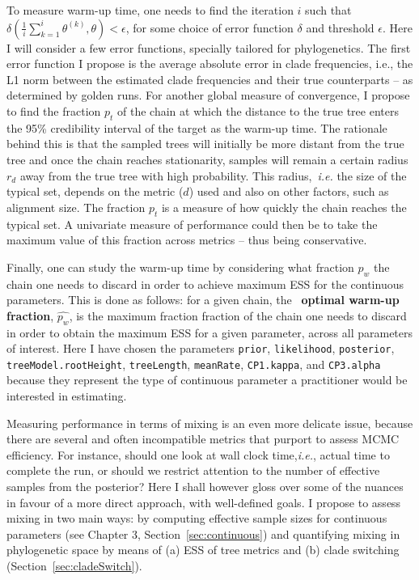 To measure warm-up time, one needs to find the iteration $i$ such that $\delta(\frac{1}{i}\sum_{k=1}^i\theta^{(k)}, \theta) < \epsilon$, for some choice of error function $\delta$ and threshold $\epsilon$.
Here I will consider a few error functions, specially tailored for phylogenetics.
The first error function I propose is the average absolute error in clade frequencies, i.e., the L1 norm between the estimated clade frequencies and their true counterparts -- as determined by golden runs.
For another global measure of convergence, I propose to find the fraction $p_t$ of the chain at which the distance to the true tree enters the 95\% credibility interval of the target as the warm-up time.
The rationale behind this is that the sampled trees will initially be more distant from the true tree and  once the chain reaches stationarity, samples will remain a certain radius $r_d$ away from the true tree with high probability.
This radius,~\textit{i.e.} the size of the typical set, depends on the metric ($d$) used and also on other factors, such as alignment size.
The fraction $p_t$ is a measure of how quickly the chain reaches the typical set.
A univariate measure of performance could then be to take the maximum value of this fraction across metrics -- thus being conservative.

Finally, one can study the warm-up time by considering what fraction $p_w$ the chain one needs to discard in order to achieve maximum ESS for the continuous parameters.
This is done as follows: for a given chain, the~\textbf{ optimal warm-up fraction}, $\hat{p_w}$, is the maximum fraction fraction of the chain one needs to discard in order to obtain the maximum ESS for a given parameter, across all parameters of interest.
Here I have chosen the parameters \verb|prior|, \verb|likelihood|, \verb|posterior|, \verb|treeModel.rootHeight|, \verb|treeLength|, \verb|meanRate|, \verb|CP1.kappa|, and  \verb|CP3.alpha| because they represent the type of continuous parameter a practitioner would be interested in estimating.

Measuring performance  in terms of mixing is an even more delicate issue, because there are several and often incompatible metrics that purport to assess MCMC efficiency.
For instance, should one look at wall clock time,\textit{i.e.}, actual time to complete the run, or should we restrict attention to the number of effective samples from the posterior?
Here I shall however gloss over some of the nuances in favour of a more direct approach, with well-defined goals.
I propose to assess mixing in two main ways: by computing effective sample sizes for continuous parameters (see Chapter 3, Section~\ref{sec:continuous}) and quantifying mixing in phylogenetic space by means of (a) ESS of tree metrics and (b) clade switching (Section~\ref{sec:cladeSwitch}).

